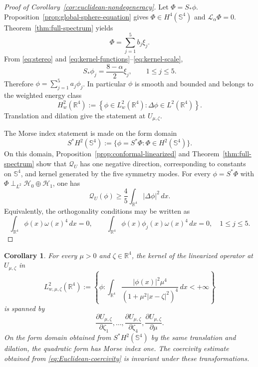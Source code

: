 \documentclass[11pt]{article}
\newtheorem{corollary}[theorem]{Corollary}
\numberwithin{equation}{section}
\begin{document}
\begin{proof}[Proof of Corollary~\ref{cor:euclidean-nondegeneracy}]
Let \(\Phi=S_{*}\phi\). Proposition~\ref{prop:global-sphere-equation} gives \(\Phi\in H^{4}(\mathbb S^{4})\) and \(\mathcal L_{\alpha}\Phi=0\). Theorem~\ref{thm:full-spectrum} yields
\[
\Phi=\sum_{j=1}^{5}b_{j}\xi_{j}.
\]
From \eqref{eq:stereo} and \eqref{eq:kernel-functions}--\eqref{eq:kernel-scale},
\[
S_{*}\phi_{j}=\frac{8-\alpha}{2}\xi_{j},
\qquad 1\leq j\leq5.
\]
Therefore \(\phi=\sum_{j=1}^{5}a_{j}\phi_{j}\). In particular
\(\phi\) is smooth and bounded and belongs to the weighted energy class
\[
H^{2}_{w}(\mathbb R^{4})
:=\left\{\phi\in L^{2}_{w}(\mathbb R^{4}):\Delta\phi\in L^{2}(\mathbb R^{4})\right\}.
\]
Translation and dilation give the statement at \(U_{\mu,\zeta}\).

The Morse index statement is made on the form domain
\[
S^{*}H^{2}(\mathbb S^{4})
:=\{\phi=S^{*}\Phi:\Phi\in H^{2}(\mathbb S^{4})\}.
\]
On this domain, Proposition~\ref{prop:conformal-linearized} and
Theorem~\ref{thm:full-spectrum} show that \(\mathcal Q_U\) has one negative
direction, corresponding to constants on \(\mathbb S^{4}\), and kernel
generated by the five symmetry modes. For every \(\phi=S^{*}\Phi\) with
\(\Phi\perp_{L^{2}}\mathcal H_{0}\oplus\mathcal H_{1}\), one has
\begin{equation}\label{eq:Euclidean-coercivity}
\mathcal Q_{U}(\phi)
\geq\frac45\int_{\mathbb R^{4}}|\Delta\phi|^{2}\,dx.
\end{equation}
Equivalently, the orthogonality conditions may be written as
\[
\int_{\mathbb R^{4}}\phi(x)\omega(x)^{4}\,dx=0,
\qquad
\int_{\mathbb R^{4}}\phi(x)\phi_{j}(x)\omega(x)^{4}\,dx=0,
\quad 1\leq j\leq5.
\]
\end{proof}

\begin{corollary}\label{cor:nondegenerate-all-bubbles}
For every \(\mu>0\) and \(\zeta\in\mathbb R^{4}\), the kernel of the linearized operator at \(U_{\mu,\zeta}\) in
\[
L^{2}_{w,\mu,\zeta}(\mathbb R^{4})
:=\left\{\phi:
\int_{\mathbb R^{4}}
\frac{|\phi(x)|^{2}\mu^{4}}
{(1+\mu^{2}|x-\zeta|^{2})^{4}}\,dx<+\infty
\right\}
\]
is spanned by
\[
\frac{\partial U_{\mu,\zeta}}{\partial\zeta_{1}},\ldots,
\frac{\partial U_{\mu,\zeta}}{\partial\zeta_{4}},
\frac{\partial U_{\mu,\zeta}}{\partial\mu}.
\]
On the form domain obtained from \(S^{*}H^{2}(\mathbb S^{4})\) by the same
translation and dilation, the quadratic form has Morse index one. The
coercivity estimate obtained from \eqref{eq:Euclidean-coercivity} is invariant
under these transformations.
\end{corollary}
\end{document}
